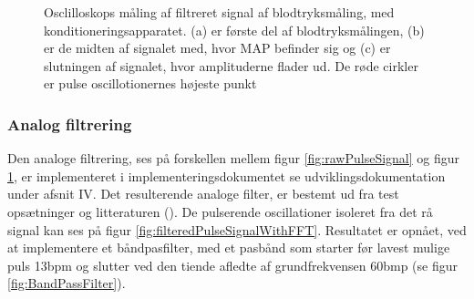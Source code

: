 \begin{figure}[H]
	\centering
	\caption{Osclilloskops måling af filtreret signal af blodtryksmåling, med konditioneringsapparatet. (a) er første del af blodtryksmålingen, (b) er de midten af signalet med, hvor MAP befinder sig og (c) er slutningen af signalet, hvor amplituderne flader ud. De røde cirkler er pulse oscillotionernes højeste punkt}\label{fig:filteredPulseSignal}
\end{figure}

\subsubsection{Analog filtrering}
Den analoge filtrering, ses på forskellen mellem figur \ref{fig:rawPulseSignal} og figur \ref{fig:filteredPulseSignal}, er implementeret i implementeringsdokumentet se udviklingsdokumentation under afsnit IV. 
Det resulterende analoge filter, er bestemt ud fra test opsætninger og litteraturen (\cite{RefWorks:8}). De pulserende oscillationer isoleret fra det rå signal kan ses på figur \ref{fig:filteredPulseSignalWithFFT}. Resultatet er opnået, ved at implementere et båndpasfilter, med et pasbånd som starter før lavest mulige puls 13bpm og slutter ved den tiende afledte af grundfrekvensen 60bmp (se figur \ref*{fig:BandPassFilter}).

